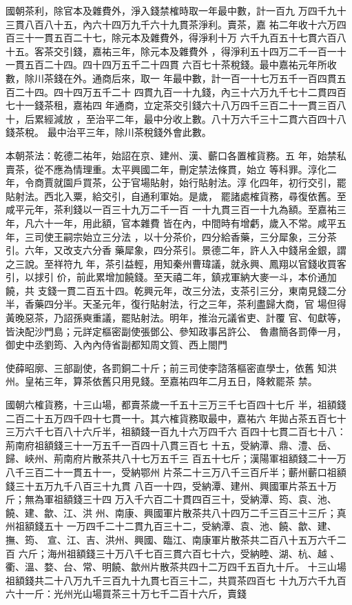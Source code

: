 \documentclass{ctexart}
\begin{document}
國朝茶利，除官本及雜費外，淨入錢禁榷時取一年最中數，計一百九 万四千九十三貫八百八十五，內六十四万九千六十九貫茶淨利。賣茶，嘉 祐二年收十六万四百三十一貫五百二十七，除元本及雜費外，得淨利十万 六千九百五十七貫六百八十五。客茶交引錢，嘉祐三年，除元本及雜費外 ，得淨利五十四万二千一百一十一貫五百二十四。四十四万五千二十四貫 六百七十茶稅錢。最中嘉祐元年所收數，除川茶錢在外。通商后來，取一 年最中數，計一百一十七万五千一百四貫五百二十四。四十四万五千二十 四貫九百一十九錢，內三十六万九千七十二貫四百七十一錢茶租，嘉祐四 年通商，立定茶交引錢六十八万四千三百二十一貫三百八十，后累經減放 ，至治平二年，最中分收上數。八十万六千三十二貫六百四十八錢茶稅。 最中治平三年，除川茶稅錢外會此數。

本朝茶法：乾德二祐年，始詔在京、建州、漢、蘄口各置榷貨務。五 年，始禁私賣茶，從不應為情理重。太平興國二年，刪定禁法條貫，始立 等科罪。淳化二年，令商賈就園戶買茶，公于官場貼射，始行貼射法。淳 化四年，初行交引，罷貼射法。西北入粟，給交引，自通利軍始。是歲， 罷諸處榷貨務，尋復依舊。至咸平元年，茶利錢以一百三十九万二千一百 一十九貫三百一十九為額。至嘉祐三年，凡六十一年，用此額，官本雜費 皆在內，中間時有增虧，歲入不常。咸平五年，三司使王嗣宗始立三分法 ，以十分茶价，四分給香藥，三分犀象，三分茶引。六年，又改支六分香 藥犀象，四分茶引。景德二年，許人入中錢帛金銀，謂之三說。至祥符九 年，茶引益輕，用知秦州曹瑋議，就永興、鳳翔以官錢收買客引，以捄引 价，前此累增加饒錢。至天禧二年，鎮戎軍納大麥一斗，本价通加饒，共 支錢一貫二百五十四。乾興元年，改三分法，支茶引三分，東南見錢二分 半，香藥四分半。天圣元年，復行貼射法，行之三年，茶利盡歸大商，官 場但得黃晚惡茶，乃詔孫奭重議，罷貼射法。明年，推治元議省吏、計覆 官、旬獻等，皆決配沙門島；元詳定樞密副使張鄧公、參知政事呂許公、 魯肅簡各罰俸一月，御史中丞劉筠、入內內侍省副都知周文質、西上閤門

使薛昭廓、三部副使，各罰銅二十斤；前三司使李諮落樞密直學士，依舊 知洪州。皇祐三年，算茶依舊只用見錢。至嘉祐四年二月五日，降敕罷茶 禁。

國朝六榷貨務，十三山場，都賣茶歲一千五十三万三千七百四十七斤 半，祖額錢二百二十五万四千四十七貫一十。其六榷貨務取最中，嘉祐六 年拋占茶五百七十三万六千七百八十六斤半，祖額錢一百九十六万四千六 百四十七貫二百七十八：荊南府祖額錢三十一万五千一百四十八貫三百七 十五，受納潭、鼎、澧、岳、歸、峽州、荊南府片散茶共八十七万五千三 百五十七斤；漢陽軍祖額錢二十一万八千三百二十一貫五十一，受納鄂州 片茶二十三万八千三百斤半；蘄州蘄口祖額錢三十五万九千八百三十九貫 八百一十四，受納潭、建州、興國軍片茶五十万斤；無為軍祖額錢三十四 万入千六百二十貫四百三十，受納潭、筠、袁、池、饒、建、歙、江、洪 州、南康、興國軍片散茶共八十四万二千三百三十三斤；真州祖額錢五十 一万四千二十二貫九百三十二，受納潭、袁、池、饒、歙、建、撫、筠、 宣、江、吉、洪州、興國、臨江、南康軍片散茶共二百八十五万六千二百 六斤；海州祖額錢三十万八千七百三貫六百七十六，受納睦、湖、杭、越 、衢、溫、婺、台、常、明饒、歙州片散茶共四十二万四千五百九十斤。 十三山場祖額錢共二十八万九千三百九十九貫七百三十二，共買茶四百七 十九万六千九百六十一斤：光州光山場買茶三十万七千二百十六斤，賣錢
\end{document}
